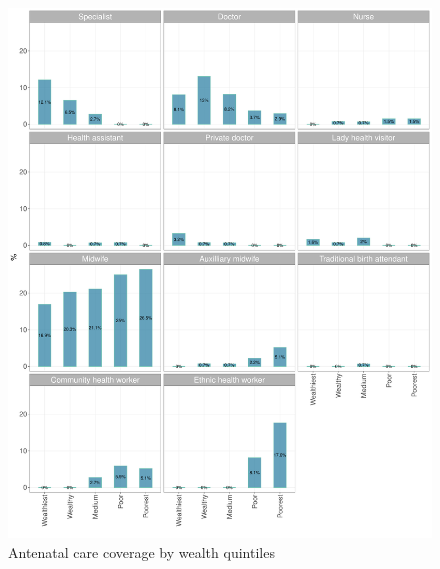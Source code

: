 \documentclass[12pt,a4paper]{article}
\begin{document}
\begin{figure}[H]

{\centering \includegraphics{kayahReport_files/figure-latex/anc2plot-1} 

}

\caption{Antenatal care coverage by wealth quintiles}\label{fig:anc2plot}
\end{figure}
\end{document}
